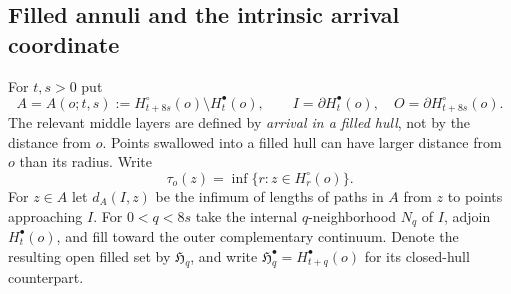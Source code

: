 \documentclass[11pt,reqno]{amsart}
\theoremstyle{plain}
\theoremstyle{definition}
\theoremstyle{remark}
\newcommand{\1}{\mathbf{1}}
\begin{document}
\subsection{Filled annuli and the intrinsic arrival coordinate}\label{subsec:good}
For $t,s>0$ put
\[
A=A(o;t,s):=H_{t+8s}^\circ(o)\setminus H_t^\bullet(o),\qquad
I=\partial H_t^\bullet(o),\quad O=\partial H_{t+8s}^\circ(o).
\]
The relevant middle layers are defined by \emph{arrival in a filled hull}, not by the distance from $o$. Points swallowed into a filled hull can have larger distance from $o$ than its radius. Write
\begin{equation*}
\tau_o(z)=\inf\{r:z\in H_r^\circ(o)\}.
\end{equation*}
For $z\in A$ let $d_A(I,z)$ be the infimum of lengths of paths in $A$ from $z$ to points approaching $I$. For $0<q<8s$ take the internal $q$-neighborhood $N_q$ of $I$, adjoin $H_t^\bullet(o)$, and fill toward the outer complementary continuum. Denote the resulting open filled set by $\mathfrak H_q$, and write $\mathfrak H_q^\bullet=H_{t+q}^\bullet(o)$ for its closed-hull counterpart.
\end{document}
